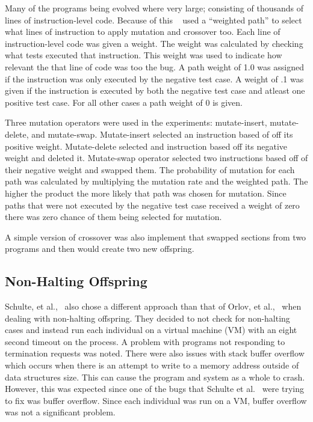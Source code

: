 \documentclass{sig-alternate}
\begin{document}
Many of the programs being evolved where very large; consisting of thousands of lines of instruction-level code. Because of this ~\cite{Assembly:2010} used a ``weighted path'' to select what lines of instruction to apply mutation and crossover too. Each line of instruction-level code was given a weight. The weight was calculated by checking what tests executed that instruction. This weight was used to indicate how relevant the that line of code was too the bug. A path weight of 1.0 was assigned if the instruction was only executed by the negative test case. A weight of .1 was given if the instruction is executed by both the negative test case and atleast one positive test case. For all other cases a path weight of 0 is given.

Three mutation operators were used in the experiments: mutate-insert, mutate-delete, and mutate-swap. Mutate-insert selected an instruction based of off its positive weight. Mutate-delete selected and instruction based off its negative weight and deleted it. Mutate-swap operator selected two instructions based off of their negative weight and swapped them. The probability of mutation for each path was calculated by multiplying the mutation rate and the weighted path. The higher the product the more likely that path was chosen for mutation. Since paths that were not executed by the negative test case received a weight of zero there was zero chance of them being selected for mutation.

A simple version of crossover was also implement that swapped sections from two programs and then would create two new offspring. 

\subsection{Non-Halting Offspring}

Schulte, et al.,~\cite{Assembly:2010} also chose a different approach than that of Orlov, et al.,~\cite{FINCH:2011} when dealing with non-halting offspring. They decided to not check for non-halting cases and instead run each individual on a virtual machine (VM) with an eight second timeout on the process. A problem with programs not responding to termination requests was noted. There were also issues with stack buffer overflow which occurs when there is an attempt to write to a memory address outside of data structures size. This can cause the program and system as a whole to crash. However, this was expected since one of the bugs that Schulte et al.~\cite{Assembly:2010} were trying to fix was buffer overflow. Since each individual was run on a VM, buffer overflow was not a significant problem.
\end{document}
